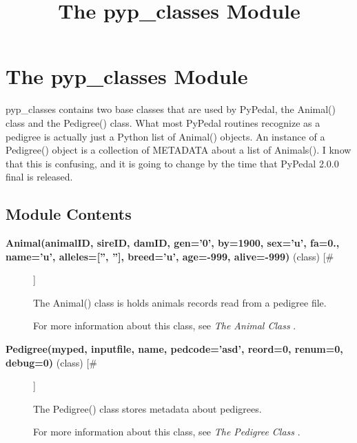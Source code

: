\documentclass[10pt]{article}
\title{The pyp\_classes Module}
\begin{document}
\section*{The pyp\_classes Module}


 pyp\_classes contains two base classes that are used by PyPedal, the Animal() class and the Pedigree() class. What most PyPedal routines recognize as a pedigree is actually just a Python list of Animal() objects. An instance of a Pedigree() object is a collection of METADATA about a list of Animals(). I know that this is confusing, and it is going to change by the time that PyPedal 2.0.0 final is released.
\subsection*{Module Contents}
\begin{description}
\item[\textbf{Animal(animalID, sireID, damID, gen='0', by=1900, sex='u', fa=0., name='u', alleles=['', ''], breed='u', age=-999, alive=-999)}
 (class) [\#]]

 The Animal() class is holds animals records read from a pedigree file.


 For more information about this class, see \emph{The Animal Class}
.

\item[\textbf{Pedigree(myped, inputfile, name, pedcode='asd', reord=0, renum=0, debug=0)}
 (class) [\#]]

 The Pedigree() class stores metadata about pedigrees.


 For more information about this class, see \emph{The Pedigree Class}
.


\end{description}
\end{document}
